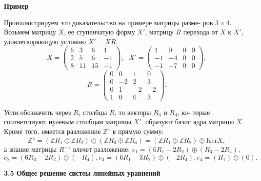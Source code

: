 	\noindent
	{\bf Пример}
	
	Проиллюстрируем это доказательство на примере матрицы разме-\linebreak
	ров $3\times 4$. Возьмем матрицу $X$, ее ступенчатую форму $X'$, матрицу $R$\linebreak
	перехода от $X$ к $X'$, удовлетворяющую условию $X' = XR$.
	$$X = \begin{pmatrix} 6 & 3 & 6 & 1 \\ 2 & 5 & 6 & -1 \\ 8 & 11 & 15 & -1 \end{pmatrix}, \ \ \ X' = \begin{pmatrix} 1 & 0 & 0 & 0 \\ -1 & -4 & 0 & 0 \\ -1 & -7 & 0 & 0 \end{pmatrix},$$
	$$R = \begin{pmatrix} 0 & 0 & 1 & 0 \\ 0 & -2 & 2 & 3 \\ 0 & 1 & -2 & -2 \\ 1 & 0 & 0 & 3 \end{pmatrix}.$$
	
	\pagebreak
	
	
	Усли обозначить через $R_i$ столбцы $R$, то векторы $R_3$ и $R_4$, ко-\linebreak
	торые соответствуют нулевым столбцам матрицы $X'$, образуют базис\linebreak
	ядра матрицы $X$. Кроме того, имеется разложение ${\mathbb Z}^4$ в прямую сумму:\linebreak
	$${\mathbb Z}^4 = (\mathbb Z R_1\oplus \mathbb Z R_2) \oplus (\mathbb Z R_3\oplus \mathbb Z R_4) = (\mathbb Z R_1\oplus \mathbb Z R_2) \oplus \text{Ker}X,$$
	а знание матрицы $R^{-1}$ влечет разложение: $e_1 = (6R_1 - 2R_2) \oplus (R_3 - 2R_4),$\linebreak
	$e_2 = (6R_3 - 2R_2) \oplus (-R_4), e_3 = (6R_1 - 3R_2) \oplus (-2R_4), e_4 = (R_1) \oplus (0).$
	
	\noindent
	{\large {\bf 3.5 Общее решение систеы линейных уравнений}}
	
